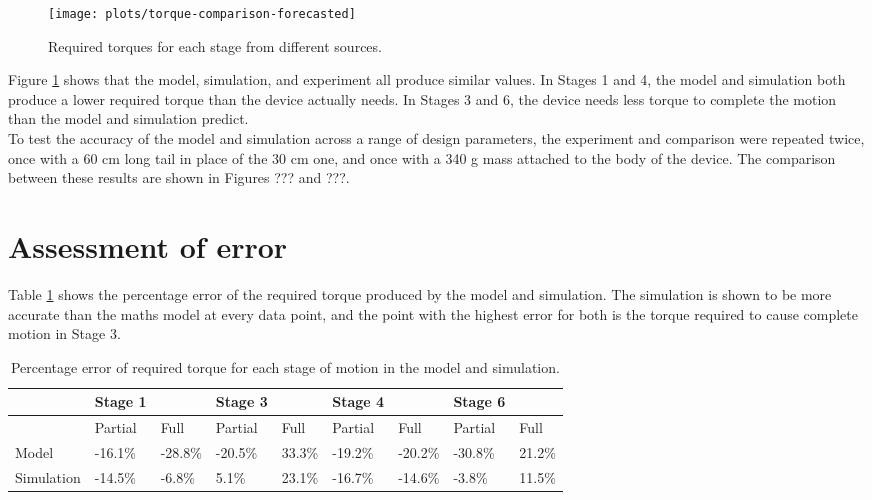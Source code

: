 \begin{figure}[!h]
	\centering
	\texttt{[image: plots/torque-comparison-forecasted]}
	\caption{Required torques for each stage from different sources.}
	\label{fig:torque-comparison}
\end{figure}

Figure \ref{fig:torque-comparison} shows that the model, simulation, and experiment all produce similar values. In Stages 1 and 4, the model and simulation both produce a lower required torque than the device actually needs. In Stages 3 and 6, the device needs less torque to complete the motion than the model and simulation predict.\\
To test the accuracy of the model and simulation across a range of design parameters, the experiment and comparison were repeated twice, once with a 60 cm long tail in place of the 30 cm one, and once with a 340 g mass attached to the body of the device. The comparison between these results are shown in Figures ??? and ???.  
\\
 
\section{Assessment of error}

Table \ref{tab:error} shows the percentage error of the required torque produced by the model and simulation. The simulation is shown to be more accurate than the maths model at every data point, and the point with the highest error for both is the torque required to cause complete motion in Stage 3.\\
 

\begin{table}[!ht]
	\centering
	\caption{Percentage error of required torque for each stage of motion in the model and simulation.}
	\label{tab:error}
	\begin{tabular}{|l|l|l|l|l|l|l|l|l|}
		\hline
		~ & Stage 1 & ~ & Stage 3 & ~ & Stage 4 & ~ & Stage 6 & ~ \\ \hline
		~ & Partial & Full & Partial & Full & Partial & Full & Partial & Full \\ \hline
		Model & -16.1\% & -28.8\% & -20.5\% & 33.3\% & -19.2\% & -20.2\% & -30.8\% & 21.2\% \\ \hline
		Simulation & -14.5\% & -6.8\% & 5.1\% & 23.1\% & -16.7\% & -14.6\% & -3.8\% & 11.5\% \\ \hline
	\end{tabular}
\end{table}

